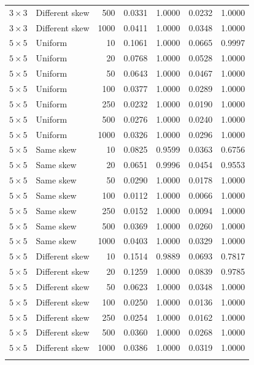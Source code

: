 \begin{longtable}{@{}llrrrrr@{}}
\(3\times3\) & Different skew & 500 & 0.0331 & 1.0000 & 0.0232 & 1.0000 \\
\(3\times3\) & Different skew & 1000 & 0.0411 & 1.0000 & 0.0348 & 1.0000 \\
\addlinespace
\(5\times5\) & Uniform & 10 & 0.1061 & 1.0000 & 0.0665 & 0.9997 \\
\(5\times5\) & Uniform & 20 & 0.0768 & 1.0000 & 0.0528 & 1.0000 \\
\(5\times5\) & Uniform & 50 & 0.0643 & 1.0000 & 0.0467 & 1.0000 \\
\(5\times5\) & Uniform & 100 & 0.0377 & 1.0000 & 0.0289 & 1.0000 \\
\(5\times5\) & Uniform & 250 & 0.0232 & 1.0000 & 0.0190 & 1.0000 \\
\(5\times5\) & Uniform & 500 & 0.0276 & 1.0000 & 0.0240 & 1.0000 \\
\(5\times5\) & Uniform & 1000 & 0.0326 & 1.0000 & 0.0296 & 1.0000 \\
\addlinespace
\(5\times5\) & Same skew & 10 & 0.0825 & 0.9599 & 0.0363 & 0.6756 \\
\(5\times5\) & Same skew & 20 & 0.0651 & 0.9996 & 0.0454 & 0.9553 \\
\(5\times5\) & Same skew & 50 & 0.0290 & 1.0000 & 0.0178 & 1.0000 \\
\(5\times5\) & Same skew & 100 & 0.0112 & 1.0000 & 0.0066 & 1.0000 \\
\(5\times5\) & Same skew & 250 & 0.0152 & 1.0000 & 0.0094 & 1.0000 \\
\(5\times5\) & Same skew & 500 & 0.0369 & 1.0000 & 0.0260 & 1.0000 \\
\(5\times5\) & Same skew & 1000 & 0.0403 & 1.0000 & 0.0329 & 1.0000 \\
\addlinespace
\(5\times5\) & Different skew & 10 & 0.1514 & 0.9889 & 0.0693 & 0.7817 \\
\(5\times5\) & Different skew & 20 & 0.1259 & 1.0000 & 0.0839 & 0.9785 \\
\(5\times5\) & Different skew & 50 & 0.0623 & 1.0000 & 0.0348 & 1.0000 \\
\(5\times5\) & Different skew & 100 & 0.0250 & 1.0000 & 0.0136 & 1.0000 \\
\(5\times5\) & Different skew & 250 & 0.0254 & 1.0000 & 0.0162 & 1.0000 \\
\(5\times5\) & Different skew & 500 & 0.0360 & 1.0000 & 0.0268 & 1.0000 \\
\(5\times5\) & Different skew & 1000 & 0.0386 & 1.0000 & 0.0319 & 1.0000 \\
\addlinespace

\end{longtable}
